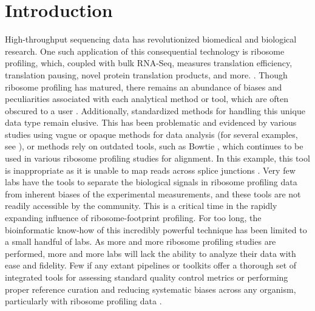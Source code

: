 \documentclass[10pt, oneside]{article}
\begin{document}
\setlength{\parindent}{2em}

\section*{Introduction}
High-throughput sequencing data has revolutionized biomedical and biological research. One such application of this consequential technology is ribosome profiling, which, coupled with bulk RNA-Seq, measures translation efficiency, translation pausing, novel protein translation products, and more. \cite{ingolia_science, riboseq_overview, ingolia_meth}. Though ribosome profiling has matured, there remains an abundance of biases and peculiarities associated with each analytical method or tool, which are often obscured to a user \cite{gerashchenko_nar, analysis_biases, riboseq_biases, riboseq_biases2, riboseq_biases3}. Additionally, standardized methods for handling this unique data type remain elusive. This has been problematic and evidenced by various studies using vague or opaque methods for data analysis (for several examples, see \cite{isrib_riboseq, scripts_1, scripts_2, scripts_3, scripts_4}), or methods rely on outdated tools, such as Bowtie \cite{bowtie}, which continues to be used in various ribosome profiling studies for alignment. In this example, this tool is inappropriate as it is unable to map reads across splice junctions \cite{analysis_biases}. Very few labs have the tools to separate the biological signals in ribosome profiling data from inherent biases of the experimental measurements, and these tools are not readily accessible by the community. This is a critical time in the rapidly expanding influence of ribosome-footprint profiling. For too long, the bioinformatic know-how of this incredibly powerful technique has been limited to a small handful of labs. As more and more ribosome profiling studies are performed, more and more labs will lack the ability to analyze their data with ease and fidelity. Few if any extant pipelines or toolkits offer a thorough set of integrated tools for assessing standard quality control metrics or performing proper reference curation and reducing systematic biases across any organism, particularly with ribosome profiling data \cite{galaxy, ribogalaxy, nextflow_pipeline, dnanexus_pipeline, riboviz}.\par
\end{document}
